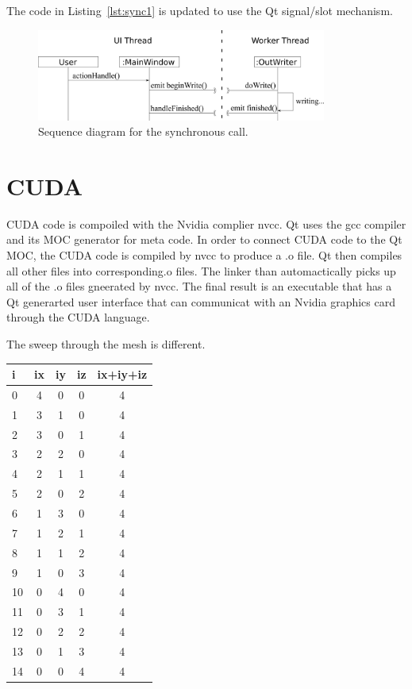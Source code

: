 The code in Listing~\ref{lst:sync1} is updated to use the Qt signal/slot mechanism.

\begin{figure}[tb]
  \begin{center}
   \includegraphics[width=3.75in]{figs/writer_async}
  \end{center}
  \caption{Sequence diagram for the synchronous call.}
\label{fig:async1}
\end{figure}%

\section{CUDA}
CUDA code is compoiled with the Nvidia complier nvcc. Qt uses the gcc compiler and its MOC generator for meta code. In order to connect CUDA code to the Qt MOC, the CUDA code is compiled by nvcc to produce a .o file. Qt then compiles all other files into corresponding.o files. The linker than automactically picks up all of the .o files gneerated by nvcc. The final result is an executable that has a Qt generarted user interface that can communicat with an Nvidia graphics card through the CUDA language.

The sweep through the mesh is different.

\begin{tabular}{ l | c | c | c | c}	
  i  & ix & iy & iz & ix+iy+iz \\ \hline
  0  & 4 & 0 & 0 & 4\\
  1  & 3 & 1 & 0 & 4\\
  2  & 3 & 0 & 1 & 4\\
  3  & 2 & 2 & 0 & 4\\
  4  & 2 & 1 & 1 & 4\\
  5  & 2 & 0 & 2 & 4\\
  6  & 1 & 3 & 0 & 4\\
  7  & 1 & 2 & 1 & 4\\
  8  & 1 & 1 & 2 & 4\\
  9  & 1 & 0 & 3 & 4\\
  10 & 0 & 4 & 0 & 4\\
  11 & 0 & 3 & 1 & 4\\
  12 & 0 & 2 & 2 & 4\\
  13 & 0 & 1 & 3 & 4\\
  14 & 0 & 0 & 4 & 4\\
\end{tabular}

